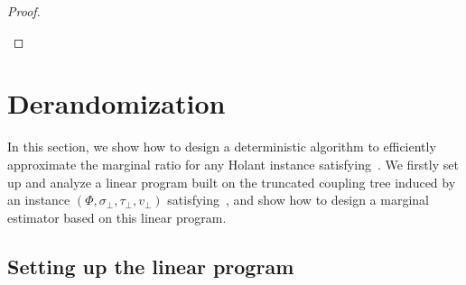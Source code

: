 \documentclass[11pt]{article}
\newcommand{\set}[1]{\left\{#1\right\}}
\newcommand{\vecf}{\boldsymbol{f}}
\renewcommand{\Pr}[2][]{ \ifthenelse{\isempty{#1}}
  {\mathbf{Pr}\left[#2\right]} {\mathbf{Pr}_{#1}\left[#2\right]} }
\begin{document}
\begin{proof}
\begin{itemize}
    
    
    
    
    \end{itemize}
\end{proof}


    
   
    
\section{Derandomization}

In this section, we show how to design a deterministic algorithm to efficiently approximate the marginal ratio for any Holant instance satisfying~. We firstly set up and analyze a linear program built on the truncated coupling tree induced by an instance $(\Phi, \sigma_\bot, \tau_\bot, v_\bot)$ satisfying~, and show how to design a marginal estimator based on this linear program.



\subsection{Setting up the linear program}
\end{document}

